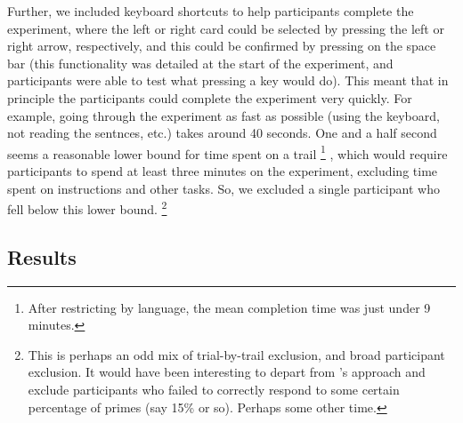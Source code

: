 \documentclass[10pt]{article}
\begin{document}
\begin{multicols}{2}
Further, we included keyboard shortcuts to help participants complete the experiment, where the left or right card could be selected by pressing the left or right arrow, respectively, and this could be confirmed by pressing on the space bar (this functionality was detailed at the start of the experiment, and participants were able to test what pressing a key would do).
  This meant that in principle the participants could complete the experiment very quickly.
  For example, going through the experiment as fast as possible (using the keyboard, not reading the sentnces, etc.) takes around 40 seconds.
  One and a half second seems a reasonable lower bound for time spent on a trail\nolinebreak
  \footnote{After restricting by language, the mean completion time was just under 9 minutes.}\nolinebreak
  , which would require participants to spend at least three minutes on the experiment, excluding time spent on instructions and other tasks.
  So, we excluded a single participant who fell below this lower bound.\nolinebreak
  \footnote{This is perhaps an odd mix of trial-by-trail exclusion, and broad participant exclusion.
    It would have been interesting to depart from \citeauthor{Bott:2016aa}'s approach and exclude participants who failed to correctly respond to some certain percentage of primes (say 15\% or so).
  Perhaps some other time.}


\subsection{Results}
\label{sec:results}


\end{multicols}
\end{document}
